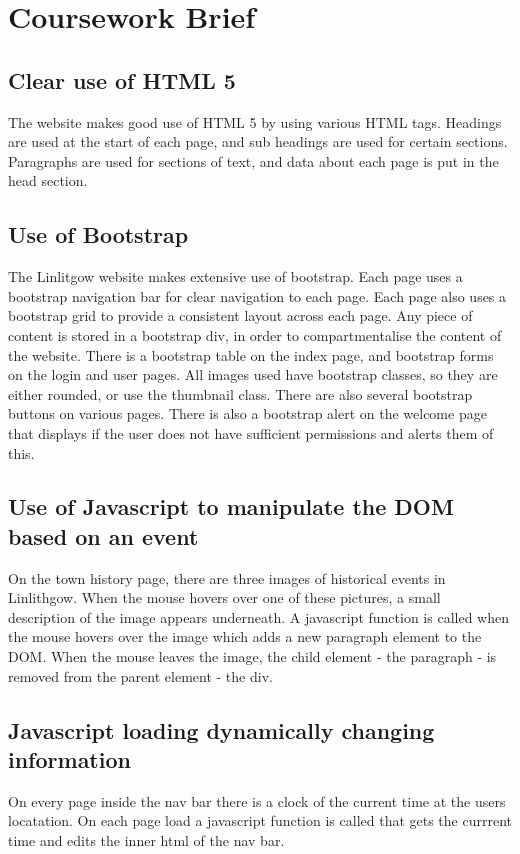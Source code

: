 \documentclass[12pt,a4paper]{article}
\begin{document}
	\clearpage

	\section{Coursework Brief}
		\subsection{Clear use of HTML 5}
		The website makes good use of HTML 5 by using various HTML tags. Headings are used at the start of each page, and sub headings are used for certain sections. Paragraphs are used for sections of text, and data about each page is put in the head section.

		\subsection{Use of Bootstrap}
		The Linlitgow website makes extensive use of bootstrap. Each page uses a bootstrap navigation bar for clear navigation to each page. Each page also uses a bootstrap grid to provide a consistent layout across each page. Any piece of content is stored in a bootstrap div, in order to compartmentalise the content of the website. There is a bootstrap table on the index page, and bootstrap forms on the login and user pages. All images used have bootstrap classes, so they are either rounded, or use the thumbnail class. There are also several bootstrap buttons on various pages. There is also a bootstrap alert on the welcome page that displays if the user does not have sufficient permissions and alerts them of this.

		\subsection{Use of Javascript to manipulate the DOM based on an event}
		On the town history page, there are three images of historical events in Linlithgow. When the mouse hovers over one of these pictures, a small description of the image appears underneath. A javascript function is called when the mouse hovers over the image which adds a new paragraph element to the DOM. When the mouse leaves the image, the child element - the paragraph - is removed from the parent element - the div.

		\subsection{Javascript loading dynamically changing information}
		On every page inside the nav bar there is a clock of the current time at the users locatation. On each page load a javascript function is called that gets the currrent time and edits the inner html of the nav bar.
\end{document}
